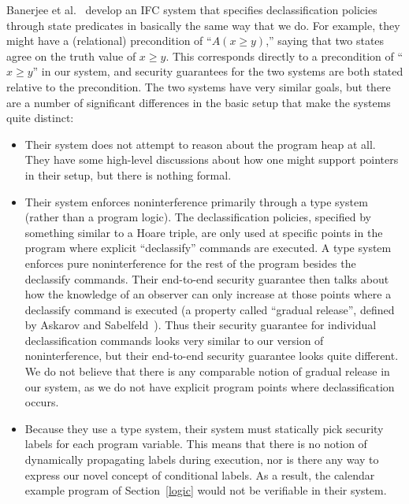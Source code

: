 Banerjee et al.\ \cite{banerjee08} develop an IFC system that specifies declassification policies
through state predicates in basically the same way that we do. For example, they might have
a (relational) precondition of ``$A(x \geq y)$,'' saying that two states agree on the truth
value of $x \geq y$. This corresponds directly to a precondition of ``$x \geq y$'' in our system,
and security guarantees for the two systems are both stated relative to the precondition.
The two systems have very similar goals, but there are a number of significant differences
in the basic setup that make the systems quite distinct:
\begin{itemize}
\item Their system does not attempt to reason about the program heap at all. They have some 
high-level discussions about how one might support pointers in their setup, but there is 
nothing formal.
\item Their system enforces noninterference primarily through a type system (rather than a 
program logic). The declassification policies, specified by something similar to a Hoare triple,
are only used at specific points in the program where explicit ``declassify'' commands are 
executed. A type system enforces pure noninterference for the rest of the program besides the 
declassify commands. Their end-to-end security guarantee then talks about how the knowledge of
an observer can only increase at those points where a declassify command is executed
(a property called ``gradual release'', defined by Askarov and Sabelfeld~\cite{askarov07}). 
Thus their security guarantee
for individual declassification commands looks very similar to our version of noninterference,
but their end-to-end security guarantee looks quite different. We do not believe that there
is any comparable notion of gradual release in our system, as we do not have explicit
program points where declassification occurs.
\item Because they use a type system, their system must statically pick security labels
for each program variable. This means that there is no notion of dynamically propagating
labels during execution, nor is there any way to express our novel concept of conditional
labels. As a result, the calendar example program of Section~\ref{logic} would not be
verifiable in their system.
\end{itemize}

